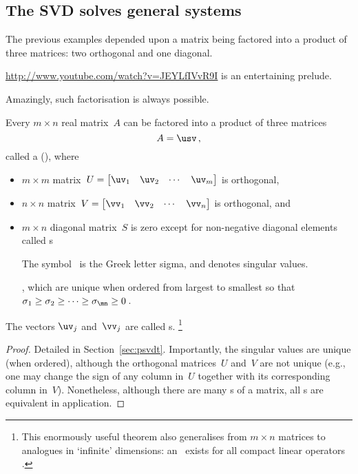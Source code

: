 \subsection{The SVD solves general systems}
\label{sec:svdsgs}

The previous examples depended upon a matrix being factored into a product of three matrices: two orthogonal and one diagonal.
\begin{aside}\url{http://www.youtube.com/watch?v=JEYLfIVvR9I} is an entertaining prelude.\end{aside}%
Amazingly, such factorisation is always possible.

\begin{theorem} \label{thm:svd} 
    Every $m\times n$ real matrix~$A$ can be factored into a product of three matrices
    \begin{equation}
        A=\usv\,,
    \end{equation}
    called a  (\svd), where
    \begin{itemize}
		\item $m\times m$ matrix~$U=\begin{bmatrix} \uv _1 &\uv_2&\cdots&\uv _m \end{bmatrix}$ is orthogonal, 
		\item $n\times n$ matrix~$V=\begin{bmatrix} \vv_1 &\vv_2&\cdots&\vv_n \end{bmatrix}$ is orthogonal, and      
        \item  $m\times n$ diagonal matrix~$S$ is zero except for non-negative diagonal elements called s
\begin{aside}
The symbol~\idx{$\sigma$} is the Greek letter sigma, and denotes singular values.
\end{aside}%
\hlist\sigma\mn, which are unique when ordered from largest to smallest so that $\sigma_1\geq \sigma_2 \geq \cdots \geq \sigma_{\mn}\geq 0$\,.
    \end{itemize}
    The  vectors \(\uv_j\) and~\(\vv_j\) are called s.
    \footnote{This enormously useful theorem also generalises from \(m\times n\) matrices to analogues in `infinite' dimensions: an \svd\ exists for all compact linear operators \cite[\S7]{Kress2015}.}
\end{theorem}

\begin{proof}
Detailed in Section~\ref{sec:psvdt}.
Importantly, the singular values are unique (when ordered), although the orthogonal matrices~\(U\) and~\(V\) are not unique (e.g., one may  change the sign of any column in~\(U\) together with its corresponding column in~\(V\)).
Nonetheless, although there are many \svd{}s of a matrix, all \svd{}s are equivalent in application.
\end{proof}


